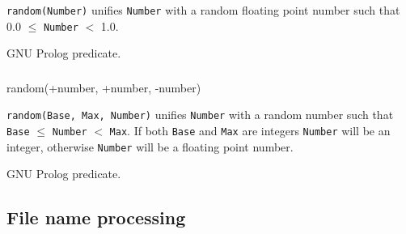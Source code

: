 \Description

\texttt{random(Number)} unifies \texttt{Number} with a random floating point
number such that 0.0 $\leq$ \texttt{Number} $<$ 1.0.

\begin{PlErrors}


\end{PlErrors}

\Portability

GNU Prolog predicate.

\subsubsection{}

\begin{TemplatesOneCol}
random(+number, +number, -number)

\end{TemplatesOneCol}

\Description

\texttt{random(Base, Max, Number)} unifies \texttt{Number} with a random
number such that \texttt{Base} $\leq$ \texttt{Number} $<$ \texttt{Max}. If
both \texttt{Base} and \texttt{Max} are integers \texttt{Number} will be an
integer, otherwise \texttt{Number} will be a floating point number.

\begin{PlErrors}






\end{PlErrors}

\Portability

GNU Prolog predicate.

\subsection{File name processing}

